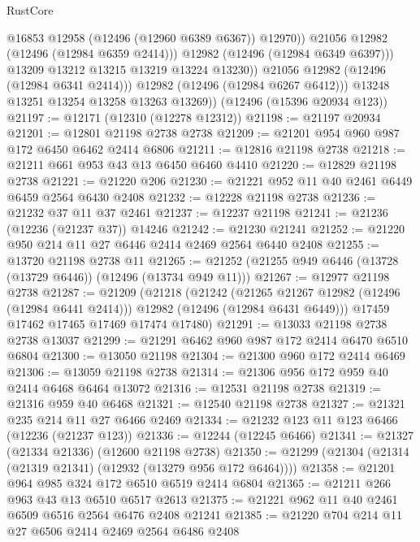 \begin{lexlean}{RustCore}
\begin{coremodule}
                        @16853
                        @12958
                        (@12496 (@12960 @6389 @6367))
                        @12970))
                    @21056
                    @12982
                    (@12496 (@12984 @6359 @2414)))
                  @12982
                  (@12496 (@12984 @6349 @6397)))
                @13209
                @13212
                @13215
                @13219
                @13224
                @13230))
            @21056
            @12982
            (@12496 (@12984 @6341 @2414)))
          @12982
          (@12496 (@12984 @6267 @6412)))
        @13248
        @13251
        @13254
        @13258
        @13263
        @13269))
    (@12496 (@15396 @20934 @123))
@21197 := @12171 (@12310 (@12278 @12312))
@21198 := @21197 @20934
@21201 := @12801 @21198 @2738 @2738
@21209 := @21201 @954 @960 @987 @172 @6450 @6462 @2414 @6806
@21211 := @12816 @21198 @2738
@21218 := @21211 @661 @953 @43 @13 @6450 @6460 @4410
@21220 := @12829 @21198 @2738
@21221 := @21220 @206
@21230 := @21221 @952 @11 @40 @2461 @6449 @6459 @2564 @6430 @2408
@21232 := @12228 @21198 @2738
@21236 := @21232 @37 @11 @37 @2461
@21237 := @12237 @21198
@21241 := @21236 (@12236 (@21237 @37)) @14246
@21242 := @21230 @21241
@21252 := @21220 @950 @214 @11 @27 @6446 @2414 @2469 @2564 @6440 @2408
@21255 := @13720 @21198 @2738 @11
@21265 := @21252 (@21255 @949 @6446 (@13728 (@13729 @6446)) (@12496 (@13734 @949 @11)))
@21267 := @12977 @21198 @2738
@21287 := @21209
    (@21218
      (@21242
        (@21265 @21267 @12982 (@12496 (@12984 @6441 @2414)))
        @12982
        (@12496 (@12984 @6431 @6449)))
      @17459
      @17462
      @17465
      @17469
      @17474
      @17480)
@21291 := @13033 @21198 @2738 @2738 @13037
@21299 := @21291 @6462 @960 @987 @172 @2414 @6470 @6510 @6804
@21300 := @13050 @21198
@21304 := @21300 @960 @172 @2414 @6469
@21306 := @13059 @21198 @2738
@21314 := @21306 @956 @172 @959 @40 @2414 @6468 @6464 @13072
@21316 := @12531 @21198 @2738
@21319 := @21316 @959 @40 @6468
@21321 := @12540 @21198 @2738
@21327 := @21321 @235 @214 @11 @27 @6466 @2469
@21334 := @21232 @123 @11 @123 @6466 (@12236 (@21237 @123))
@21336 := @12244 (@12245 @6466)
@21341 := @21327 (@21334 @21336) (@12600 @21198 @2738)
@21350 := @21299 (@21304 (@21314 (@21319 @21341) (@12932 (@13279 @956 @172 @6464))))
@21358 := @21201 @964 @985 @324 @172 @6510 @6519 @2414 @6804
@21365 := @21211 @266 @963 @43 @13 @6510 @6517 @2613
@21375 := @21221 @962 @11 @40 @2461 @6509 @6516 @2564 @6476 @2408 @21241
@21385 := @21220 @704 @214 @11 @27 @6506 @2414 @2469 @2564 @6486 @2408

\end{coremodule}
\end{lexlean}
